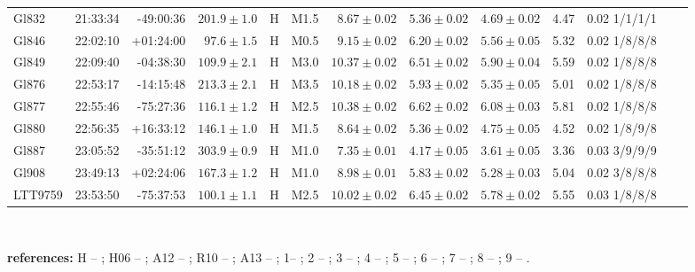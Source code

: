 \documentclass[referee]{aa}
\begin{document}
\begin{table}[h!]
{\begin{tabular}{ l r r r c c r r r r r r r}
Gl832 & 21:33:34 & -49:00:36 & $201.9 \pm  1.0$ & H & M1.5 &  $8.67 \pm 0.02$ & $5.36 \pm 0.02$ & $4.69 \pm 0.02$ & 4.47 & 0.02 1/1/1/1 \\
Gl846 & 22:02:10 & +01:24:00 & $97.6 \pm  1.5$ & H & M0.5 &  $9.15 \pm 0.02$ & $6.20 \pm 0.02$ & $5.56 \pm 0.05$ & 5.32 & 0.02 1/8/8/8 \\
Gl849 & 22:09:40 & -04:38:30 & $109.9 \pm  2.1$ & H & M3.0 &  $10.37 \pm 0.02$ & $6.51 \pm 0.02$ & $5.90 \pm 0.04$ & 5.59 & 0.02 1/8/8/8 \\
Gl876 & 22:53:17 & -14:15:48 & $213.3 \pm  2.1$ & H & M3.5 &  $10.18 \pm 0.02$ & $5.93 \pm 0.02$ & $5.35 \pm 0.05$ & 5.01 & 0.02 1/8/8/8 \\
Gl877 & 22:55:46 & -75:27:36 & $116.1 \pm  1.2$ & H & M2.5 &  $10.38 \pm 0.02$ & $6.62 \pm 0.02$ & $6.08 \pm 0.03$ & 5.81 & 0.02 1/8/8/8 \\
Gl880 & 22:56:35 & +16:33:12 & $146.1 \pm  1.0$ & H & M1.5 &  $8.64 \pm 0.02$ & $5.36 \pm 0.02$ & $4.75 \pm 0.05$ & 4.52 & 0.02 1/8/9/8 \\
Gl887 & 23:05:52 & -35:51:12 & $303.9 \pm  0.9$ & H & M1.0 &  $7.35 \pm 0.01$ & $4.17 \pm 0.05$ & $3.61 \pm 0.05$ & 3.36 & 0.03 3/9/9/9 \\
Gl908 & 23:49:13 & +02:24:06 & $167.3 \pm  1.2$ & H & M1.0 &  $8.98 \pm 0.01$ & $5.83 \pm 0.02$ & $5.28 \pm 0.03$ & 5.04 & 0.02 3/8/8/8 \\
LTT9759 & 23:53:50 & -75:37:53 & $100.1 \pm  1.1$ & H & M2.5 &  $10.02 \pm 0.02$ & $6.45 \pm 0.02$ & $5.78 \pm 0.02$ & 5.55 & 0.03 1/8/8/8 \\
\hline
\hline
\end{tabular}
}
{
\\
\raggedright{
\textbf{references:} H -- \citep{van-Leeuwen-2007}; H06 -- \citet{Henry-2006}; A12 -- \citet{Anglada-Escude-2012}; R10 -- \citet{Riedel-2010}; A13 -- \citet{Anglada-Escude-2013}; 1-- \citet{Koen-2010}; 2 -- \citet{Henden-2009,Henden-2012}; 3 -- \citet{Perryman-1997}; 4 -- \citet{Weis-1993}; 5 -- \citet{Laing-1989}; 6 -- \citet{Fabricius-2002}; 7 -- \citet{Dawson-1992}; 8 -- \citet{Skrutskie-2006}; 9 -- \citet{Leggett-1992}. \\
}
}
\end{table}








\end{document}
